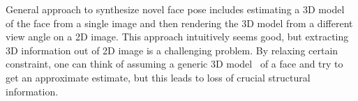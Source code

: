 General approach to synthesize novel face pose includes estimating a {\sc 3D} model~\cite{Wolf} of the face 
from a single image and then rendering the {\sc 3D} model from a different view angle on a {\sc 2D} image.
This approach intuitively seems good, but extracting {\sc 3D} information out of {\sc 2D} image is a
challenging problem. By relaxing certain constraint, one can think of assuming a generic {\sc 3D} model~\cite{DBLP:journals/corr/HassnerHPE14}
of a face and try to get an approximate estimate, but this leads to loss of crucial structural
information.

